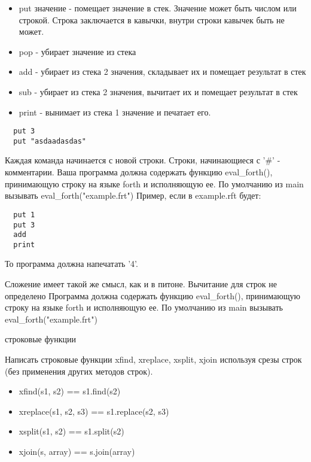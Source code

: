 \documentclass{article}
\begin{document}
\begin{itemize}
    \item put значение - помещает значение в стек. Значение может
          быть числом или строкой. Строка заключается в кавычки, внутри
          строки кавычек быть не может.
    \item pop - убирает значение из стека
    \item add - убирает из стека 2 значения, складывает их и помещает результат в стек
    \item sub - убирает из стека 2 значения, вычитает их и помещает результат в стек
    \item print - вынимает из стека 1 значение и печатает его.
\end{itemize}


\begin{lstlisting}
  put 3
  put "asdaadasdas"
\end{lstlisting}

      Каждая команда начинается с новой строки. Строки, начинающиеся с '\#' - комментарии.
      Ваша программа должна содержать функцию eval\_forth(), принимающую строку на языке
      forth и исполняющую ее. По умолчанию из main вызывать eval\_forth("example.frt")
      Пример, если в example.rft будет:

\begin{lstlisting}
  put 1
  put 3
  add
  print
\end{lstlisting}

      То программа должна напечатать '4'. 

  Сложение имеет такой же смысл, как и в питоне. Вычитание для строк не определено
  Программа должна содержать функцию eval\_forth(), принимающую строку на языке forth и исполняющую ее. 
  По умолчанию из main вызывать eval\_forth("example.frt")
\newpage

\begin{center} строковые функции \end{center}
Написать строковые функции xfind, xreplace, xsplit, xjoin используя
срезы строк (без применения других методов строк).
\begin{itemize}
    \item xfind(s1, s2) == s1.find(s2)
    \item xreplace(s1, s2, s3) == s1.replace(s2, s3)
    \item xsplit(s1, s2) == s1.split(s2)
    \item xjoin(s, array) == s.join(array)
\end{itemize}
\newpage
\end{document}
